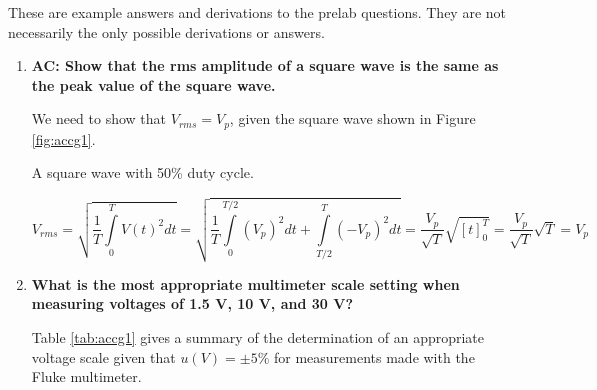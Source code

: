 These are example answers and derivations to the prelab questions. They are not necessarily the only possible derivations or answers.

\begin{enumerate}
\item {\bf AC: Show that the rms amplitude of a square wave is the same as the peak value of the square wave.}\newline

We need to show that $V_{rms}=V_{p}$, given the square wave shown in Figure \ref{fig:accg1}. 

\begin{marginfigure}
\caption{A square wave with 50\% duty cycle.}
\label{fig:accg1}
\end{marginfigure}

\begin{subequations}
\begin{equation}
V_{rms}=\sqrt{\dfrac{1}{T}\int\limits_{0}^{T}V(t)^2dt}
\end{equation}
\begin{equation}
=\sqrt{\dfrac{1}{T}\int\limits_0^{T/2}(V_p)^2dt+\int\limits_{T/2}^{T}(-V_p)^2dt}
\end{equation}
\begin{equation}
=\dfrac{V_p}{\sqrt{T}}\sqrt{\left[t\right]_0^T}
\end{equation}
\begin{equation}
=\dfrac{V_p}{\sqrt{T}}\sqrt{T}
\end{equation}
\begin{equation}
=V_p
\end{equation}
\label{equ:accg1}
\end{subequations}

\item {\bf What is the most appropriate multimeter scale setting when measuring voltages of 1.5 V, 10 V, and 30 V?}\newline

Table \ref{tab:accg1} gives a summary of the determination of an appropriate voltage scale given that $u(V)=\pm 5\%$ for measurements made with the Fluke multimeter.


\end{enumerate}

